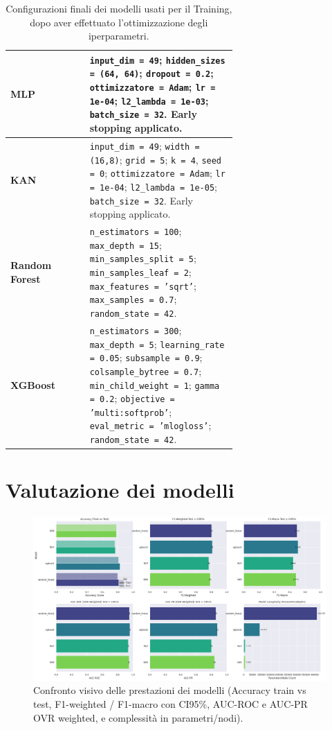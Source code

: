 \documentclass[a4paper,12pt]{report}
\begin{document}
	\begin{table}[H]
		\centering
		\caption{Configurazioni finali dei modelli usati per il Training, dopo aver effettuato l'ottimizzazione degli iperparametri.}
		\label{tab:model-config-pm}
		\begin{tabular}{l p{0.65\linewidth}}
			\toprule
			\textbf{MLP} & \texttt{input\_dim = 49}; \texttt{hidden\_sizes = (64, 64)}; \texttt{dropout = 0.2}; \texttt{ottimizzatore = Adam}; \texttt{lr = 1e-04}; \texttt{l2\_lambda = 1e-03}; \texttt{batch\_size = 32}. Early stopping applicato. \\
			\midrule
			\textbf{KAN} & \texttt{input\_dim = 49}; \texttt{width = (16,8)}; \texttt{grid = 5}; \texttt{k = 4}, \texttt{seed = 0}; \texttt{ottimizzatore = Adam}; \texttt{lr = 1e-04}; \texttt{l2\_lambda = 1e-05}; \texttt{batch\_size = 32}. Early stopping applicato. \\
			\midrule
			\textbf{Random Forest} & \texttt{n\_estimators = 100}; \texttt{max\_depth = 15}; \texttt{min\_samples\_split = 5}; \texttt{min\_samples\_leaf = 2}; \texttt{max\_features = 'sqrt'}; \texttt{max\_samples = 0.7}; \texttt{random\_state = 42}. \\
			\midrule
			\textbf{XGBoost} & \texttt{n\_estimators = 300}; \texttt{max\_depth = 5}; \texttt{learning\_rate = 0.05}; \texttt{subsample = 0.9}; \texttt{colsample\_bytree = 0.7}; \texttt{min\_child\_weight = 1}; \texttt{gamma = 0.2}; \texttt{objective = 'multi:softprob'}; \texttt{eval\_metric = 'mlogloss'}; \texttt{random\_state = 42}. \\
			\bottomrule
		\end{tabular}
	\end{table}
	
	\section{Valutazione dei modelli}
	
	\begin{figure}[H]
		\centering
		\includegraphics[width=1.0\textwidth]{img/comparison_pm.png}
		\caption{Confronto visivo delle prestazioni dei modelli (Accuracy train vs test, F1-weighted / F1-macro con CI95\%, AUC-ROC e AUC-PR OVR weighted, e complessità in parametri/nodi).}
		\label{fig:comparison_pm}
	\end{figure}
	
\end{document}
